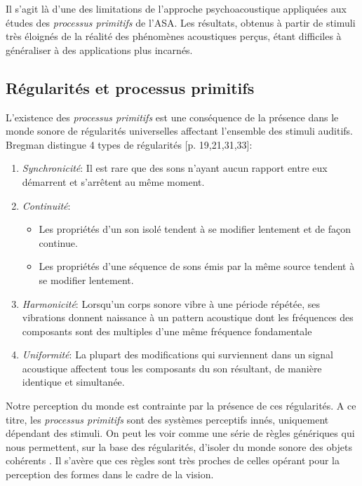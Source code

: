 Il s'agit là d'une des limitations de l'approche psychoacoustique appliquées aux études des  \emph{processus primitifs} de l'ASA. Les résultats, obtenus à partir de stimuli très éloignés de la réalité des phénomènes acoustiques perçus, étant difficiles à généraliser à des applications plus incarnés.

\subsection{Régularités et processus primitifs}

L'existence des \emph{processus primitifs} est une conséquence de la présence dans le monde sonore de régularités universelles affectant l'ensemble des stimuli auditifs. Bregman distingue 4 types de régularités [p. 19,21,31,33]\citep{mcadams1994penser}:

\begin{enumerate}
\item \emph{Synchronicité}: Il est rare que des sons n'ayant aucun rapport entre eux démarrent et s'arrêtent au même moment.
\item \emph{Continuité}: 
\begin{itemize}
\item Les propriétés d'un son isolé tendent à se modifier lentement et de façon continue.
\item Les propriétés d'une séquence de sons émis par la même source tendent à se modifier lentement.
\end{itemize}
\item \emph{Harmonicité}: Lorsqu'un corps sonore vibre à une période répétée, ses vibrations donnent naissance à un pattern acoustique dont les fréquences des composants sont des multiples d'une même fréquence fondamentale
\item \emph{Uniformité}: La plupart des modifications qui surviennent dans un signal acoustique affectent tous les composants du son résultant, de manière identique et simultanée.
\end{enumerate}

Notre perception du monde est contrainte par la présence de ces régularités. A ce titre, les \emph{processus primitifs} sont des systèmes perceptifs innés, uniquement dépendant des stimuli. On peut les voir comme une série de règles génériques qui nous permettent, sur la base des régularités, d'isoler du monde sonore des objets cohérents \citep{ballas1987interpreting}. Il s'avère que ces règles sont très proches de celles opérant pour la perception des formes dans le cadre de la vision.  

